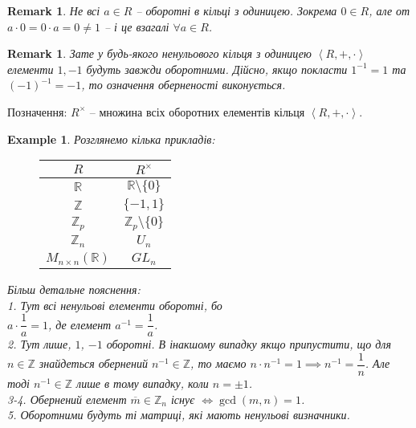 \documentclass[a4paper, 10pt]{article}
\theoremstyle{theoremdd}
\theoremstyle{theoremdd}
\theoremstyle{theoremdd}
\theoremstyle{theoremdd}
\theoremstyle{theoremdd}
\newtheorem{example}[theorem]{Example}
\theoremstyle{theoremdd}
\theoremstyle{theoremdd}
\theoremstyle{theoremdd}
\theoremstyle{theoremdd}
\theoremstyle{theoremdd}
\theoremstyle{theoremdd}
\newtheorem{remark}[theorem]{Remark}
\theoremstyle{theoremdd}
\theoremstyle{theoremdd}
\theoremstyle{theoremdd}
\theoremstyle{theoremdd}
\begin{document}
\begin{remark}
Не всі $a \in R$ -- оборотні в кільці з одиницею. Зокрема $0 \in R$, але от $a \cdot 0 = 0 \cdot a = 0 \neq 1$ -- і це взагалі $\forall a \in R$.
\end{remark}

\begin{remark}
Зате у будь-якого ненульового кільця з одиницею $\left<R,+,\cdot \right>$ елементи $1,-1$ будуть завжди оборотними. Дійсно, якщо покласти $1^{-1} = 1$ та $(-1)^{-1} = -1$, то означення оберненості виконується.
\end{remark}

Позначення: $R^\times$ -- множина всіх оборотних елементів кільця $\left<R,+,\cdot \right>$.

\begin{example}
Розглянемо кілька прикладів:
\begin{figure}[H]
\centering
\begin{tabular}{c|c}
$R$ & $R^\times$ \\
\hline
$\mathbb{R}$ & $\mathbb{R} \setminus \{0\}$ \\
$\mathbb{Z}$ & $\{-1,1\}$ \\
$\mathbb{Z}_p$ & $\mathbb{Z}_p \setminus \{0\}$ \\
$\mathbb{Z}_n$ & $U_n$ \\
$M_{n \times n}(\mathbb{R})$ & $GL_n$ \\
\end{tabular}
\end{figure}
Більш детальне пояснення:\\
1. Тут всі ненульові елементи оборотні, бо\\
$a \cdot \dfrac{1}{a} = 1$, де елемент $a^{-1} = \dfrac{1}{a}$.
\bigskip \\
2. Тут лише, $1$, $-1$ оборотні. В інакшому випадку якщо припустити, що для $n \in \mathbb{Z}$ знайдеться обернений $n^{-1} \in \mathbb{Z}$, то маємо $n \cdot n^{-1} = 1 \implies n^{-1} = \dfrac{1}{n}$. Але тоді $n^{-1} \in \mathbb{Z}$ лише в тому випадку, коли $n = \pm 1$.
\bigskip \\
3-4. Обернений елемент $\overline{m} \in \mathbb{Z}_n$ існує $\iff \gcd(m,n) = 1$.
\bigskip \\
5. Оборотними будуть ті матриці, які мають ненульові визначники.
\end{example}
\end{document}

